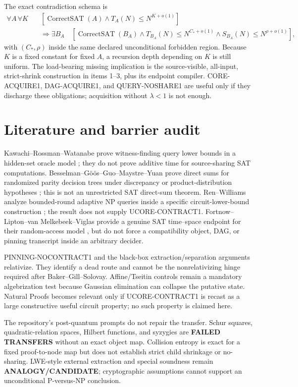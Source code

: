 \documentclass[11pt]{article}
\begin{document}
The exact contradiction schema is
\[
\begin{split}
\forall A\,\forall K\quad
&[\operatorname{CorrectSAT}(A)\wedge T_A(N)\le N^{K+o(1)}]\\
&\Longrightarrow \exists B_A\quad
[\operatorname{CorrectSAT}(B_A)\wedge
T_{B_A}(N)\le N^{C_*+o(1)}\wedge
S_{B_A}(N)\le N^{\rho+o(1)}],
\end{split}
\tag{4}
\]
with $(C_*,\rho)$ inside the same declared unconditional forbidden region.
Because $K$ is a fixed constant for fixed $A$, a recursion depth depending on
$K$ is still uniform.  The load-bearing missing implication is the
source-visible, all-input, strict-shrink construction in items 1--3, plus its
endpoint compiler.  \textsf{CORE-ACQUIRE1}, \textsf{DAG-ACQUIRE1}, and
\textsf{QUERY-NOSHARE1} are useful only if they discharge these obligations;
acquisition without $\lambda<1$ is not enough.

\section{Literature and barrier audit}
Kawachi--Rossman--Watanabe prove witness-finding query lower bounds in a
hidden-set oracle model \cite{krw}; they do not prove additive time for
source-sharing SAT computations.  Besselman--G\"o\"os--Guo--Maystre--Yuan
prove direct sums for randomized parity decision trees under discrepancy or
product-distribution hypotheses \cite{bggmy}; this is not an unrestricted SAT
direct-sum theorem.  Ren--Williams analyze bounded-round adaptive NP queries
inside a specific circuit-lower-bound construction \cite{rw}; the result does
not supply UCORE-CONTRACT1.  Fortnow--Lipton--van Melkebeek--Viglas provide a
genuine SAT time--space endpoint for their random-access model \cite{flmv},
but do not force a compatibility object, DAG, or pinning transcript inside an
arbitrary decider.

PINNING-NOCONTRACT1 and the black-box extraction/separation arguments
relativize.  They identify a dead route and cannot be the nonrelativizing
hinge required after Baker--Gill--Solovay.  Affine/Tseitin controls remain a
mandatory algebrization test because Gaussian elimination can collapse the
putative state.  Natural Proofs becomes relevant only if UCORE-CONTRACT1 is
recast as a large constructive useful circuit property; no such property is
claimed here.

The repository's post-quantum prompts do not repair the transfer.  Schur
squares, quadratic-relation spaces, Hilbert functions, and syzygies are
\textbf{FAILED TRANSFERS} without an exact object map.  Collision entropy is
exact for a fixed proof-to-node map but does not establish strict child
shrinkage or no-sharing.  LWE-style external extraction and special soundness
remain \textbf{ANALOGY/CANDIDATE}; cryptographic assumptions cannot support an
unconditional P-versus-NP conclusion.
\end{document}
